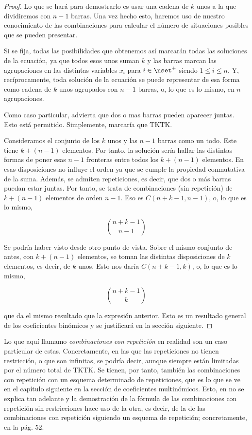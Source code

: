 \begin{proof}
  Lo que se hará para demostrarlo es usar una cadena de $k$ unos a la que
  dividiremos con $n - 1$ barras. Una vez hecho esto, haremos uso de nuestro
  conocimiento de las combinaciones para calcular el número de situaciones
  posibles que se pueden presentar.

  Si se fija, todas las posibilidades que obtenemos así marcarán todas las
  soluciones de la ecuación, ya que todos esos unos suman $k$ y las barras
  marcan las agrupaciones en las distintas variables $x_i$ para $i \in
  \nset^{+}$ siendo $1 \leq i \leq n$. Y, recíprocamente, toda solución de
  la ecuación se puede representar de esa forma como cadena de $k$ unos
  agrupados con $n - 1$ barras, o, lo que es lo mismo, en $n$ agrupaciones.

  Como caso particular, advierta que dos o mas barras pueden aparecer
  juntas. Esto está permitido. Simplemente, marcaría que TKTK.

  Consideramos el conjunto de los $k$ unos y las $n-1$ barras como un todo.
  Este tiene $k + (n - 1)$ elementos. Por tanto, la solución sería hallar
  las distintas formas de poner esas $n-1$ fronteras entre todos los $k + (n
  - 1)$ elementos. En esas disposiciones no influye el orden ya que se
  cumple la propiedad conmutativa de la suma. Además, se admiten
  repeticiones, es decir, que dos o más barras puedan estar juntas. Por
  tanto, se trata de combinaciones (sin repetición) de $k + (n - 1)$
  elementos de orden $n-1$. Eso es $C(n + k - 1, n-1)$, o, lo que es lo
  mismo,

  $$ {n + k - 1 \choose n-1} $$

  Se podría haber visto desde otro punto de vista. Sobre el mismo conjunto
  de antes, con $k + (n-1)$ elementos, se toman las distintas disposiciones
  de $k$ elementos, es decir, de $k$ unos. Esto nos daría $C(n + k - 1, k)$,
  o, lo que es lo mismo,

  $$ {n + k - 1 \choose k} $$

  \noindent que da el mismo resultado que la expresión anterior. Esto es un
  resultado general de los coeficientes binómicos y se justificará en la
  sección siguiente.
\end{proof}

Lo que aquí llamamo \emph{combinaciones con repetición} en realidad son un caso
particular de estas. Concretamente, en las que las repeticiones no tienen
restricción, o que son infinitas, se podría decir, aunque siempre están
limitadas por el número total de TKTK. Se tienen, por tanto, también las
combinaciones con repetición con un esquema determinado de repeticiones, que
es lo que se ve en el capítulo siguiente en la sección de coeficientes
multinómicos. Esto, en \cite{brualdi} no se explica tan adelante y la
demostración de la fórmula de las combinaciones con repetición sin
restricciones hace uso de la otra, es decir, de la de las combinaciones con
repetición siguiendo un esquema de repetición; concretamente, en la pág. 52.

